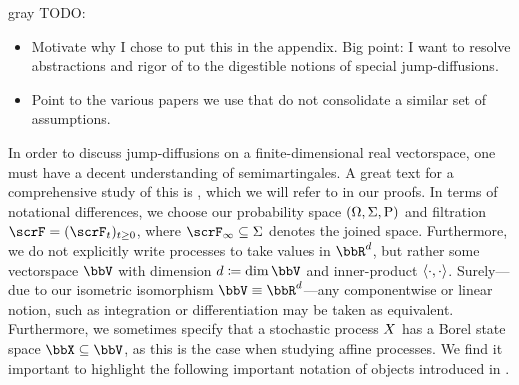 \begin{color}{gray}
  TODO:
  \begin{itemize}
    \item
      Motivate why I chose to put this in the appendix. Big point: I want to resolve abstractions and rigor of \cite{jacod2003} to the digestible notions of special jump-diffusions.
    \item
      Point to the various papers we use that do not consolidate a similar set of assumptions.
  \end{itemize}
\end{color}

In order to discuss jump-diffusions on a finite-dimensional real vectorspace, one must have a decent understanding of semimartingales.
A great text for a comprehensive study of this is \cite{jacod2003}, which we will refer to in our proofs.
In terms of notational differences, we choose our probability space $(\Omega, \Sigma, {\operatorname{P}})$ and filtration $\scrF=(\scrF_t)_{t\geq0}$, where $\scrF_\infty \subseteq \Sigma$ denotes the joined space.
Furthermore, we do not explicitly write processes to take values in $\bbR^d$, but rather some vectorspace $\vecSpace$ with dimension $d \defeq \operatorname{dim}\vecSpace$ and inner-product ${\langle \cdot , \cdot \rangle}$.
Surely---due to our isometric isomorphism $\vecSpace \equiv \bbR^d$---any componentwise or linear notion, such as integration or differentiation may be taken as equivalent.
Furthermore, we sometimes specify that a stochastic process $X$ has a Borel state space $\stateSpace\subseteq \vecSpace$, as this is the case when studying affine processes.
We find it important to highlight the following important notation of objects introduced in \cite[Chapters I-II]{jacod2003}.
